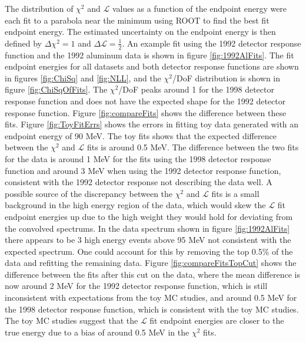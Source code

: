 The distribution of $\chi^2$ and $\mathcal{L}$ values as a function of the endpoint energy were each fit to a parabola near 
the minimum using ROOT to find the best fit endpoint energy. The estimated uncertainty on the endpoint energy is then
defined by $\Delta \chi^2 = 1$ and $\Delta \mathcal{L} = \frac{1}{2}$. An example fit using the 1992 detector response function
and the 1992 aluminum data is shown in figure \ref{fig:1992AlFits}. The fit endpoint energies for all 
datasets and both detector response functions are shown in figures \ref{fig:ChiSq} and \ref{fig:NLL}, and the $\chi^2$/DoF
distribution is shown in figure \ref{fig:ChiSqOfFits}. The $\chi^2$/DoF peaks around 1 for the 1998 detector response 
function and does not have the expected shape for the 1992 detector response function. Figure \ref{fig:compareFits}
shows the difference between these fits. Figure \ref{fig:ToyFitErrs} shows the errors in fitting toy data generated with
an endpoint energy of 90 MeV. The toy fits shows that the expected difference between the $\chi^2$ and $\mathcal{L}$ fits 
is around 0.5 MeV. The difference between the two fits for the data is around 1 MeV for the fits using the 1998 detector 
response function and around 3 MeV when using the 1992 detector response function, consistent with the 1992 detector response 
not describing the data well. A possible source of the discrepancy between the $\chi^2$ and $\mathcal{L}$ fits is a small background 
in the high energy region of the data, which would skew the $\mathcal{L}$ fit endpoint energies up due to the high weight they would hold for deviating
from the convolved spectrums. In the data spectrum shown in figure \ref{fig:1992AlFits} there appears to be 3 high energy events above 95 MeV
not consistent with the expected spectrum. One could account for this by removing the top 0.5\% of the data and refitting the remaining
data. Figure \ref{fig:compareFitsTopCut} shows the difference between the fits after this cut on the data, where the 
mean difference is now around 2 MeV for the 1992 detector response function, which is still inconsistent with expectations from
the toy MC studies, and around 0.5 MeV for the 1998 detector response function, which is consistent with the toy MC studies.
The toy MC studies suggest that the $\mathcal{L}$ fit endpoint energies are closer to the true energy due to a bias of around 0.5 MeV 
in the $\chi^2$ fits.


